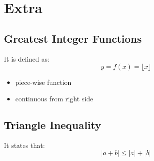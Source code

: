 \documentclass[10pt,a4paper,oneside]{article}
\begin{document}
\section{Extra}

\subsection{Greatest Integer Functions}
It is defined as:
\[
y = f(x) =\lfloor x \rfloor
\]
\begin{itemize}
	\item piece-wise function
	\item continuous from right side  
\end{itemize}

\subsection{Triangle Inequality}
It states that:
\[
|a+b| \leq |a| + |b|
\]
\end{document}
